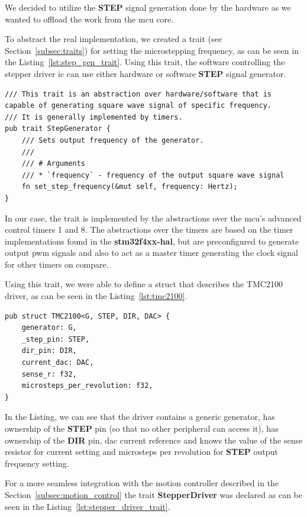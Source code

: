 We decided to utilize the \textbf{STEP} signal generation done by the hardware as we wanted to offload the work from the \acs{mcu} core.

To abstract the real implementation, we created a trait (see Section~\ref{subsec:traits}) for setting the microstepping frequency, as can be seen in the Listing~\ref{lst:step_gen_trait}.
Using this trait, the software controlling the stepper driver \acs{ic} can use either hardware or software \textbf{STEP} signal generator.

\begin{lstlisting}[caption={Trait for abstracting STEP generation.},label=lst:step_gen_trait]
/// This trait is an abstraction over hardware/software that is capable of generating square wave signal of specific frequency.
/// It is generally implemented by timers.
pub trait StepGenerator {
    /// Sets output frequency of the generator.
    ///
    /// # Arguments
    /// * `frequency` - frequency of the output square wave signal
    fn set_step_frequency(&mut self, frequency: Hertz);
}
\end{lstlisting}

In our case, the trait is implemented by the abstractions over the \acs{mcu}'s advanced control timers 1 and 8.
The abstractions over the timers are based on the timer implementations found in the \textbf{stm32f4xx-hal}, but are preconfigured to generate output \acs{pwm} signals and also to act as a master timer generating the clock signal for other timers on compare.

Using this trait, we were able to define a struct that describes the TMC2100 driver, as can be seen in the Listing~\ref{lst:tmc2100}.

\begin{lstlisting}[caption={TMC2100 driver.},label=lst:tmc2100]
pub struct TMC2100<G, STEP, DIR, DAC> {
    generator: G,
    _step_pin: STEP,
    dir_pin: DIR,
    current_dac: DAC,
    sense_r: f32,
    microsteps_per_revolution: f32,
}
\end{lstlisting}
In the Listing, we can see that the driver contains a generic generator, has ownership of the \textbf{STEP} pin (so that no other peripheral can access it), has ownership of the \textbf{DIR} pin, \acs{dac} current reference and knows the value of the sense resistor for current setting and microsteps per revolution for \textbf{STEP} output frequency setting.

For a more seamless integration with the motion controller described in the Section~\ref{subsec:motion_control} the trait \textbf{StepperDriver} was declared as can be seen in the Listing~\ref{lst:stepper_driver_trait}.

